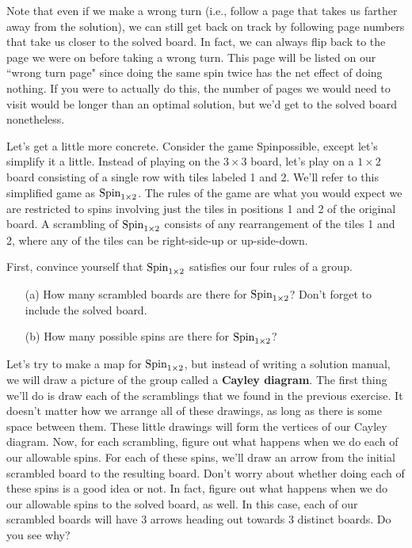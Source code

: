 Note that even if we make a wrong turn (i.e., follow a page that takes us farther away from the solution), we can still get back on track by following page numbers that take us closer to the solved board.  In fact, we can always flip back to the page we were on before taking a wrong turn.  This page will be listed on our ``wrong turn page" since doing the same spin twice has the net effect of doing nothing.  If you were to actually do this, the number of pages we would need to visit would be longer than an optimal solution, but we'd get to the solved board nonetheless.

Let's get a little more concrete.  Consider the game Spinpossible, except let's simplify it a little.  Instead of playing on the \(3\times 3\) board, let's play on a \(1\times 2\) board consisting of a single row with tiles labeled 1 and 2.  We'll refer to this simplified game as \(\operatorname{Spin}_{1\times 2}\).  The rules of the game are what you would expect we are restricted to spins involving just the tiles in positions 1 and 2 of the original board.  A scrambling of \(\operatorname{Spin}_{1\times 2}\) consists of any rearrangement of the tiles 1 and 2, where any of the tiles can be right-side-up or up-side-down.

\begin{exercise}
First, convince yourself that \(\operatorname{Spin}_{1\times 2}\) satisfies our four rules of a group.
\begin{enumerate}
\item[(a)] How many scrambled boards are there for \(\operatorname{Spin}_{1\times 2}\)?  Don't forget to include the solved board.
\item[(b)] How many possible spins are there for \(\operatorname{Spin}_{1\times 2}\)?
\end{enumerate}
\end{exercise}

Let's try to make a map for \(\operatorname{Spin}_{1\times 2}\), but instead of writing a solution manual, we will draw a picture of the group called a \textbf{Cayley diagram}.  The first thing we'll do is draw each of the scramblings that we found in the previous exercise.  It doesn't matter how we arrange all of these drawings, as long as there is some space between them.  These little drawings will form the vertices of our Cayley diagram.  Now, for each scrambling, figure out what happens when we do each of our allowable spins.  For each of these spins, we'll draw an arrow from the initial scrambled board to the resulting board.  Don't worry about whether doing each of these spins is a good idea or not.  In fact, figure out what happens when we do our allowable spins to the solved board, as well.  In this case, each of our scrambled boards will have 3 arrows heading out towards 3 distinct boards.  Do you see why?  

